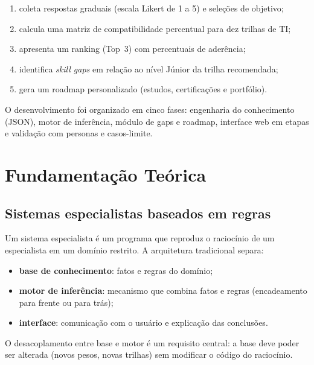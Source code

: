 \documentclass[12pt,a4paper]{article}
\begin{document}
\begin{enumerate}
    \item coleta respostas graduais (escala Likert de 1 a 5) e sele\c{c}\~oes de objetivo;
    \item calcula uma matriz de compatibilidade percentual para dez trilhas de TI;
    \item apresenta um ranking (Top~3) com percentuais de ader\^encia;
    \item identifica \textit{skill gaps} em rela\c{c}\~ao ao n\'ivel J\'unior da trilha recomendada;
    \item gera um roadmap personalizado (estudos, certifica\c{c}\~oes e portf\'olio).
\end{enumerate}

O desenvolvimento foi organizado em cinco fases: engenharia do conhecimento (JSON),
motor de infer\^encia, m\'odulo de gaps e roadmap, interface web em etapas e
valida\c{c}\~ao com personas e casos-limite.

\section{Fundamenta\c{c}\~ao Te\'orica}

\subsection{Sistemas especialistas baseados em regras}

Um sistema especialista \'e um programa que reproduz o racioc\'inio de um
especialista em um dom\'inio restrito. A arquitetura tradicional
separa:

\begin{itemize}
    \item \textbf{base de conhecimento}: fatos e regras do dom\'inio;
    \item \textbf{motor de infer\^encia}: mecanismo que combina fatos e regras
          (encadeamento para frente ou para tr\'as);
    \item \textbf{interface}: comunica\c{c}\~ao com o usu\'ario e explica\c{c}\~ao das conclus\~oes.
\end{itemize}

O desacoplamento entre base e motor \'e um requisito central: a base deve poder ser
alterada (novos pesos, novas trilhas) sem modificar o c\'odigo do racioc\'inio.
\end{document}

